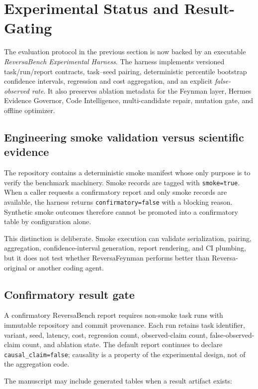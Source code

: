 \section{Experimental Status and Result-Gating}

The evaluation protocol in the previous section is now backed by an executable \emph{ReversaBench Experimental Harness}. The harness implements versioned task/run/report contracts, task--seed pairing, deterministic percentile bootstrap confidence intervals, regression and cost aggregation, and an explicit \emph{false-observed rate}. It also preserves ablation metadata for the Feynman layer, Hermes Evidence Governor, Code Intelligence, multi-candidate repair, mutation gate, and offline optimizer.

\subsection{Engineering smoke validation versus scientific evidence}

The repository contains a deterministic smoke manifest whose only purpose is to verify the benchmark machinery. Smoke records are tagged with \texttt{smoke=true}. When a caller requests a confirmatory report and only smoke records are available, the harness returns \texttt{confirmatory=false} with a blocking reason. Synthetic smoke outcomes therefore cannot be promoted into a confirmatory table by configuration alone.

This distinction is deliberate. Smoke execution can validate serialization, pairing, aggregation, confidence-interval generation, report rendering, and CI plumbing, but it does not test whether ReversaFeynman performs better than Reversa-original or another coding agent.

\subsection{Confirmatory result gate}

A confirmatory ReversaBench report requires non-smoke task runs with immutable repository and commit provenance. Each run retains task identifier, variant, seed, latency, cost, regression count, observed-claim count, false-observed-claim count, and ablation state. The default report continues to declare \texttt{causal\_claim=false}; causality is a property of the experimental design, not of the aggregation code.

The manuscript may include generated tables when a result artifact exists:

